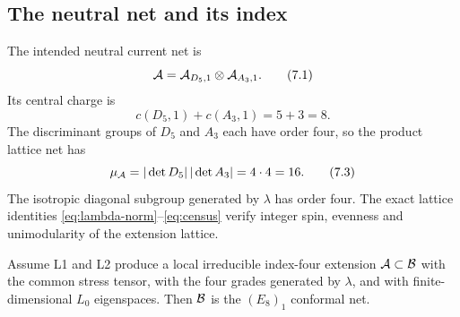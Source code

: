 \subsection{The neutral net and its index}

The intended neutral current net is
\[
 \mathcal A=\mathcal A_{D_5,1}\otimes\mathcal A_{A_3,1}.
\tag{7.1}\label{eq:basenet}
\]
Its central charge is
\[
 c(D_5,1)+c(A_3,1)=5+3=8.
\tag{7.2}\label{eq:c8}
\]
The discriminant groups of $D_5$ and $A_3$ each have order four, so the
product lattice net has
\[
 \mu_\mathcal A=|\det D_5|\,|\det A_3|=4\cdot4=16.
\tag{7.3}\label{eq:mu16}
\]
The isotropic diagonal subgroup generated by $\lambda$ has order four.
The exact lattice identities \eqref{eq:lambda-norm}--\eqref{eq:census}
verify integer spin, evenness and unimodularity of the extension lattice.

\begin{theorem}\label{thm:identification}
Assume L1 and L2 produce a local irreducible index-four extension
$\mathcal A\subset\mathcal B$ with the common stress tensor, with the four grades
generated by $\lambda$, and with finite-dimensional $L_0$ eigenspaces.
Then $\mathcal B$ is the $(E_8)_1$ conformal net.
\end{theorem}

